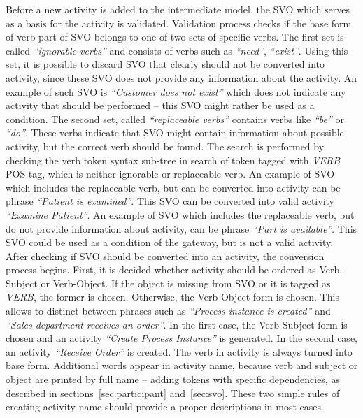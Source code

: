 Before a new activity is added to the intermediate model, the SVO which serves as a basis for the activity is validated. Validation process checks if the base form of verb part of SVO belongs to one of two sets of specific verbs. The first set is called \emph{``ignorable verbs''} and consists of verbs such as \emph{``need''}, \emph{``exist''}. Using this set, it is possible to discard SVO that clearly should not be converted into activity, since these SVO does not provide any information about the activity. An example of such SVO is \emph{``Customer does not exist''} which does not indicate any activity that should be performed -- this SVO might rather be used as a condition. The second set, called \emph{``replaceable verbs''} contains verbs like \emph{``be''} or \emph{``do''}. These verbs indicate that SVO might contain information about possible activity, but the correct verb should be found. The search is performed by checking the verb token syntax sub-tree in search of token tagged with \emph{VERB} POS tag, which is neither ignorable or replaceable verb. An example of SVO which includes the replaceable verb, but can be converted into activity can be phrase \emph{``Patient is examined''}. This SVO can be converted into valid activity \emph{``Examine Patient''}. An example of SVO which includes the replaceable verb, but do not provide information about activity, can be phrase \emph{``Part is available''}. This SVO could be used as a condition of the gateway, but is not a valid activity.\\
After checking if SVO should be converted into an activity, the conversion process begins. First, it is decided whether activity should be ordered as Verb-Subject or Verb-Object. If the object is missing from SVO or it is tagged as \emph{VERB}, the former is chosen. Otherwise, the Verb-Object form is chosen. This allows to distinct between phrases such as \emph{``Process instance is created''} and \emph{``Sales department receives an order''}. In the first case, the Verb-Subject form is chosen and an activity \emph{``Create Process Instance''} is generated. In the second case, an activity \emph{``Receive Order''} is created. The verb in activity is always turned into base form. Additional words appear in activity name, because verb and subject or object are printed by full name -- adding tokens with specific dependencies, as described in sections~\ref{sec:participant} and~\ref{sec:svo}. These two simple rules of creating activity name should provide a proper descriptions in most cases.


